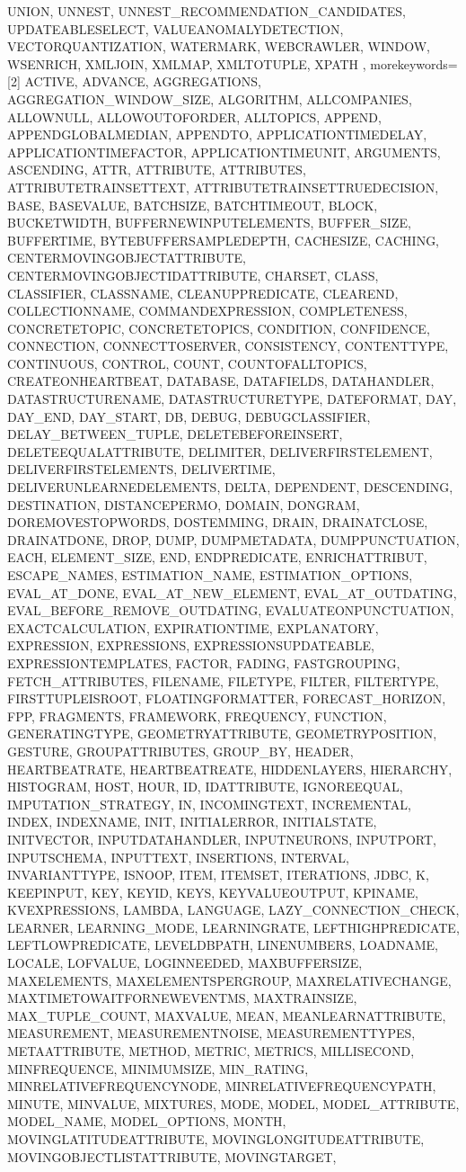 {{UNION, UNNEST, UNNEST_RECOMMENDATION_CANDIDATES, UPDATEABLESELECT, VALUEANOMALYDETECTION, VECTORQUANTIZATION, WATERMARK, WEBCRAWLER, WINDOW, WSENRICH, XMLJOIN, XMLMAP, XMLTOTUPLE, XPATH%
      },%
   morekeywords=[2]{%
ACTIVE, ADVANCE, AGGREGATIONS, AGGREGATION_WINDOW_SIZE, ALGORITHM, ALLCOMPANIES, ALLOWNULL, ALLOWOUTOFORDER, ALLTOPICS, APPEND, APPENDGLOBALMEDIAN, APPENDTO, APPLICATIONTIMEDELAY, APPLICATIONTIMEFACTOR, APPLICATIONTIMEUNIT, ARGUMENTS, ASCENDING, ATTR, ATTRIBUTE, ATTRIBUTES, ATTRIBUTETRAINSETTEXT, ATTRIBUTETRAINSETTRUEDECISION, BASE, BASEVALUE, BATCHSIZE, BATCHTIMEOUT, BLOCK, BUCKETWIDTH, BUFFERNEWINPUTELEMENTS, BUFFER_SIZE, BUFFERTIME, BYTEBUFFERSAMPLEDEPTH, CACHESIZE, CACHING, CENTERMOVINGOBJECTATTRIBUTE, CENTERMOVINGOBJECTIDATTRIBUTE, CHARSET, CLASS, CLASSIFIER, CLASSNAME, CLEANUPPREDICATE, CLEAREND, COLLECTIONNAME, COMMANDEXPRESSION, COMPLETENESS, CONCRETETOPIC, CONCRETETOPICS, CONDITION, CONFIDENCE, CONNECTION, CONNECTTOSERVER, CONSISTENCY, CONTENTTYPE, CONTINUOUS, CONTROL, COUNT, COUNTOFALLTOPICS, CREATEONHEARTBEAT, DATABASE, DATAFIELDS, DATAHANDLER, DATASTRUCTURENAME, DATASTRUCTURETYPE, DATEFORMAT, DAY, DAY_END, DAY_START, DB, DEBUG, DEBUGCLASSIFIER, DELAY_BETWEEN_TUPLE, DELETEBEFOREINSERT, DELETEEQUALATTRIBUTE, DELIMITER, DELIVERFIRSTELEMENT, DELIVERFIRSTELEMENTS, DELIVERTIME, DELIVERUNLEARNEDELEMENTS, DELTA, DEPENDENT, DESCENDING, DESTINATION, DISTANCEPERMO, DOMAIN, DONGRAM, DOREMOVESTOPWORDS, DOSTEMMING, DRAIN, DRAINATCLOSE, DRAINATDONE, DROP, DUMP, DUMPMETADATA, DUMPPUNCTUATION, EACH, ELEMENT_SIZE, END, ENDPREDICATE, ENRICHATTRIBUT, ESCAPE_NAMES, ESTIMATION_NAME, ESTIMATION_OPTIONS, EVAL_AT_DONE, EVAL_AT_NEW_ELEMENT, EVAL_AT_OUTDATING, EVAL_BEFORE_REMOVE_OUTDATING, EVALUATEONPUNCTUATION, EXACTCALCULATION, EXPIRATIONTIME, EXPLANATORY, EXPRESSION, EXPRESSIONS, EXPRESSIONSUPDATEABLE, EXPRESSIONTEMPLATES, FACTOR, FADING, FASTGROUPING, FETCH_ATTRIBUTES, FILENAME, FILETYPE, FILTER, FILTERTYPE, FIRSTTUPLEISROOT, FLOATINGFORMATTER, FORECAST_HORIZON, FPP, FRAGMENTS, FRAMEWORK, FREQUENCY, FUNCTION, GENERATINGTYPE, GEOMETRYATTRIBUTE, GEOMETRYPOSITION, GESTURE, GROUPATTRIBUTES, GROUP_BY, HEADER, HEARTBEATRATE, HEARTBEATREATE, HIDDENLAYERS, HIERARCHY, HISTOGRAM, HOST, HOUR, ID, IDATTRIBUTE, IGNOREEQUAL, IMPUTATION_STRATEGY, IN, INCOMINGTEXT, INCREMENTAL, INDEX, INDEXNAME, INIT, INITIALERROR, INITIALSTATE, INITVECTOR, INPUTDATAHANDLER, INPUTNEURONS, INPUTPORT, INPUTSCHEMA, INPUTTEXT, INSERTIONS, INTERVAL, INVARIANTTYPE, ISNOOP, ITEM, ITEMSET, ITERATIONS, JDBC, K, KEEPINPUT, KEY, KEYID, KEYS, KEYVALUEOUTPUT, KPINAME, KVEXPRESSIONS, LAMBDA, LANGUAGE, LAZY_CONNECTION_CHECK, LEARNER, LEARNING_MODE, LEARNINGRATE, LEFTHIGHPREDICATE, LEFTLOWPREDICATE, LEVELDBPATH, LINENUMBERS, LOADNAME, LOCALE, LOFVALUE, LOGINNEEDED, MAXBUFFERSIZE, MAXELEMENTS, MAXELEMENTSPERGROUP, MAXRELATIVECHANGE, MAXTIMETOWAITFORNEWEVENTMS, MAXTRAINSIZE, MAX_TUPLE_COUNT, MAXVALUE, MEAN, MEANLEARNATTRIBUTE, MEASUREMENT, MEASUREMENTNOISE, MEASUREMENTTYPES, METAATTRIBUTE, METHOD, METRIC, METRICS, MILLISECOND, MINFREQUENCE, MINIMUMSIZE, MIN_RATING, MINRELATIVEFREQUENCYNODE, MINRELATIVEFREQUENCYPATH, MINUTE, MINVALUE, MIXTURES, MODE, MODEL, MODEL_ATTRIBUTE, MODEL_NAME, MODEL_OPTIONS, MONTH, MOVINGLATITUDEATTRIBUTE, MOVINGLONGITUDEATTRIBUTE, MOVINGOBJECTLISTATTRIBUTE, MOVINGTARGET, }}
